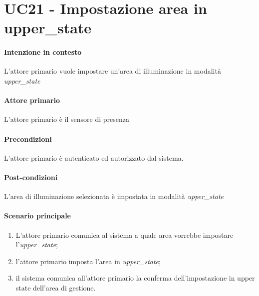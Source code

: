 \section{UC21 - Impostazione area in upper\_state}\label{uc:21}
\paragraph{Intenzione in contesto} L'attore primario vuole impostare un'area di illuminazione in modalità \textit{upper\_state}
\paragraph{Attore primario} L'attore primario è il sensore di presenza
\paragraph{Precondizioni} L'attore primario è autenticato ed autorizzato dal sistema.
\paragraph{Post-condizioni} L'area di illuminazione selezionata è impostata in modalità \textit{upper\_state}
\paragraph{Scenario principale}
\begin{enumerate}
    \item L'attore primario comunica al sistema a quale area vorrebbe impostare l'\textit{upper\_state};
    \item l'attore primario imposta l'area in \textit{upper\_state};
    \item il sistema comunica all'attore primario la conferma dell'impostazione in upper state dell'area di gestione.
\end{enumerate}